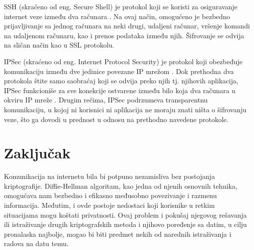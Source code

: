 \documentclass[a4paper]{article}
\begin{document}

SSH (skraćeno od eng. Secure Shell) je protokol koji se koristi za osiguravanje internet veze između dva računara \cite{use}. Na ovaj način, omogućeno je bezbedno prijavljivanje sa jednog računara na neki drugi, udaljeni računar, vršenje komandi na udaljenom računaru, kao i prenos podataka između njih. Šifrovanje se odvija na sličan način kao u SSL protokolu.

IPSec (skraćeno od eng. Internet Protocol Security) je protokol koji obezbeđuje komunikaciju između dve jedinice povezane IP mrežom \cite{use}. Dok prethodna dva protokola štite samo saobraćaj koji se odvija preko njih tj. njihovih aplikacija, IPSec funkcioniše za sve konekcije ostvarene između bilo koja dva računara u okviru IP mreže \cite{use}. Drugim rečima, IPSec podrzumeva transparentnu komunikaciju, u kojoj ni korisnici ni aplikacija ne moraju znati ništa o šifrovanju veze, što ga dovodi u prednost u odnosu na prethodno navedene protokole.
\section{Zaključak}
\label{sec:zakljucak}

Komunikacija na internetu bila bi potpuno nezamisliva bez postojanja kriptografije. Diffie-Hellman algoritam, kao jedna od njenih osnovnih tehnika, omogućava nam bezbedno i efikasno međusobno povezivanje i razmenu informacija. Međutim, i ovde postoje nedostaci koji korisnike u retkim situacijama mogu koštati privatnosti. Ovaj problem i pokušaj njegovog rešavanja ili istraživanje drugih kriptografskih metoda i njihovo poređenje sa datim, u cilju pronalaska najbolje, mogao bi biti predmet nekih od narednih istraživanja i radova na datu temu.

\appendix

\end{document}

